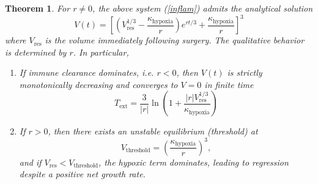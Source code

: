 \documentclass[11pt, reqno]{amsart}
\numberwithin{equation}{section}
\newtheorem{theorem}{Theorem}[section]
\theoremstyle{definition}
\begin{document}
\begin{theorem}%
\label{thm:inflam}
For $r \neq 0$, the above system (\ref{inflam}) admits the analytical solution
\begin{equation}
V(t) = \left[ \left( V_{\text{res}}^{1/3} - \frac{\kappa_{\text{hypoxia}}}{r} \right) e^{rt/3} + \frac{\kappa_{\text{hypoxia}}}{r} \right]^3
\end{equation}
where $V_{\text{res}}$ is the volume immediately following surgery. The qualitative behavior is determined by $r$. In particular,
\begin{enumerate}
    \item[(i)] If immune clearance dominates, i.e. $r<0$, then $V(t)$ is strictly monotonically decreasing and converges to $V=0$ in finite time
    \begin{equation}
    T_{\text{ext}} = \frac{3}{|r|} \ln \left( 1 + \frac{|r|V_{\text{res}}^{1/3}}{\kappa_{\text{hypoxia}}} \right)
    \end{equation}
    \vspace{0.15cm}
    
    \item[(ii)] If $r > 0$, then there exists an unstable equilibrium (threshold) at $$V_{\text{threshold}} = \left( \frac{\kappa_{\text{hypoxia}}}{r} \right)^3,$$ and if $V_{\text{res}} < V_{\text{threshold}}$, the hypoxic term dominates, leading to regression despite a positive net growth rate.
\end{enumerate}
\end{theorem}
\end{document}
